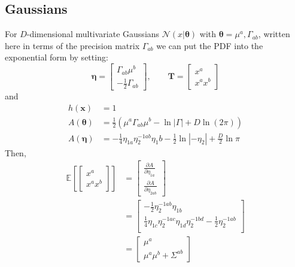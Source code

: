 \documentclass[aps,showpacs,twocolumn,prd,superscriptaddress,nofootinbib]{revtex4}
\newcommand{\nn}{\nonumber}
\newcommand{\E}[1]{{\mathbb E}_{#1}\!}
\begin{document}
\subsection{Gaussians}
For $D$-dimensional multivariate Gaussians $\mathcal{N}(x|\bm\theta)$ with $\bm\theta={\mu^a,\Gamma_{ab}}$, written here in terms of the precision matrix $\Gamma_{ab}$ we can put the PDF into the exponential form by setting:
\begin{equation}
\bm\eta=
\begin{bmatrix}
  \Gamma_{ab}\mu^b\\
  -\frac12\Gamma_{ab}
\end{bmatrix},\qquad
\bm T=
\begin{bmatrix}
  x^a\\
  x^ax^b
\end{bmatrix}\label{eq:Normalexp}
\end{equation}
and
\begin{align}
h(\bm x)&=1\nn\\
A(\bm\theta)&=\frac12\left(\mu^a\Gamma_{ab}\mu^b-\ln|\Gamma|+D\ln(2\pi)\right)\label{eq:NormalAth}\\
A(\bm\eta)&=-\frac14\eta_{1a}\eta_2^{-1ab}\eta_1{b}-\frac12\ln\left|{-\eta_2}\right|+\frac D2\ln\pi\nn
\end{align}
Then, 
\begin{align*}
\E{}\left[ 
\begin{bmatrix}
  x^a\\
  x^ax^b
\end{bmatrix}
\right]
&=
\begin{bmatrix}
  \frac{\partial A}{\partial\eta_{1a}}\\[.7ex]
  \frac{\partial A}{\partial\eta_{2ab}}
\end{bmatrix}\nn\\
&=
\begin{bmatrix}
-\frac12\eta_{2}^{-1ab}\eta_{1b}\\[.7ex]
\frac14\eta_{1c}\eta_{2}^{-1ac}\eta_{1d}\eta_{2}^{-1bd}-\frac12\eta_{2}^{-1ab}\\  
\end{bmatrix}\nn\\
&=
\begin{bmatrix}
\mu^a\\[.7ex]
\mu^a\mu^b+\Sigma^{ab}
\end{bmatrix}\nn
\end{align*}
\end{document}
